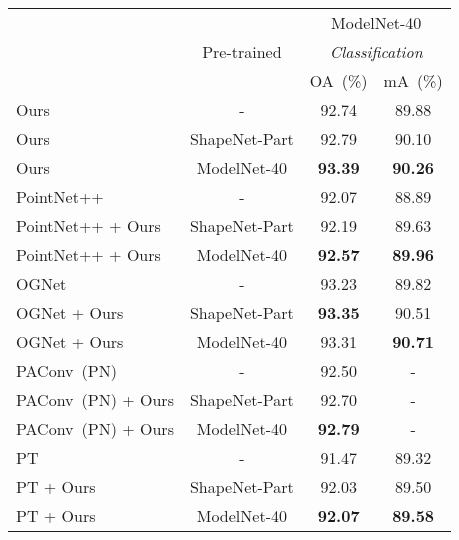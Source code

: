 \documentclass[journal]{IEEEtran}
\begin{document}
\begin{table}[t]
\footnotesize
\setlength{\tabcolsep}{2.8pt}
\begin{center}
\vspace{-0.2cm}
\setlength{\tabcolsep}{2.3mm} {
\begin{tabular}{l|c|c|c}
\shline
\multirow{3}{*}{Methods}&
\multirow{3}{*}{Pre-trained}& 
\multicolumn{2}{c}{ModelNet-40} \\
& & \multicolumn{2}{c}{\emph{Classification}} \\
\cline{3-4}
& & OA~(\%) & mA~(\%) \\
\shline
Ours & -             & 92.74 & 89.88 \\
Ours & ShapeNet-Part & 92.79 & 90.10 \\
Ours & ModelNet-40   &  \textbf{93.39} & \textbf{90.26} \\
\hline
PointNet++ ~\cite{qi2017pointnet++}  & - & 92.07 & 88.89 \\
PointNet++   + Ours & ShapeNet-Part & 92.19 & 89.63 \\
PointNet++   + Ours & ModelNet-40 & \textbf{92.57} & \textbf{89.96} \\
\hline
OGNet ~\cite{zheng2020parameter} & - & 93.23 & 89.82 \\
OGNet + Ours  & ShapeNet-Part & \textbf{93.35} & 90.51 \\
OGNet + Ours & ModelNet-40 & 93.31 & \textbf{90.71} \\
\hline
{\color{black}PAConv~(PN)} ~\cite{xu2021paconv} & {\color{black}-} & {\color{black}92.50} & {\color{black}-} \\
{\color{black}PAConv~(PN) + Ours}  & {\color{black}ShapeNet-Part} & {\color{black}92.70} & {\color{black}-} \\
{\color{black}PAConv~(PN) + Ours} & {\color{black}ModelNet-40} & {\color{black}\textbf{92.79}} & {\color{black}-} \\

\hline
{\color{black}PT} ~\cite{zhao2021point} & {\color{black}-} & {\color{black}91.47} & {\color{black}89.32} \\
{\color{black}PT} + {\color{black}Ours}  & {\color{black}ShapeNet-Part} & {\color{black}92.03} & {\color{black}89.50} \\
{\color{black}PT + Ours} & {\color{black}ModelNet-40} & {\color{black}\textbf{92.07}} & {\color{black}\textbf{89.58}} \\


\end{tabular}}
\end{center}
\end{table}
\end{document}
